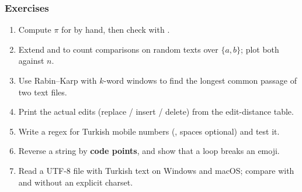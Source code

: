 \documentclass[aspectratio=169,10pt,compress]{beamer}
\begin{document}
\begin{frame}[t,fragile] \frametitle{Exercises}

  \begin{enumerate}\small
    
    \item Compute $\pi$ for  by hand, then check with .
    
    \item Extend  and  to count comparisons on random texts over $\{a, b\}$; plot both against $n$.
    
    \item Use Rabin--Karp with $k$-word windows to find the longest common passage of two text files.
    
    \item Print the actual edits (replace / insert / delete) from the edit-distance table.
    
    \item Write a regex for Turkish mobile numbers (, spaces optional) and test it.
    
    \item Reverse a string by \textbf{code points}, and show that a  loop breaks an emoji.
    
    \item Read a UTF-8 file with Turkish text on Windows and macOS; 
    compare with and without an explicit charset.
  \end{enumerate}
  
\end{frame}




\begin{frame}[t,fragile]
	\begin{center}
		\vspace{4cm}
	\end{center}
\end{frame}
\end{document}
